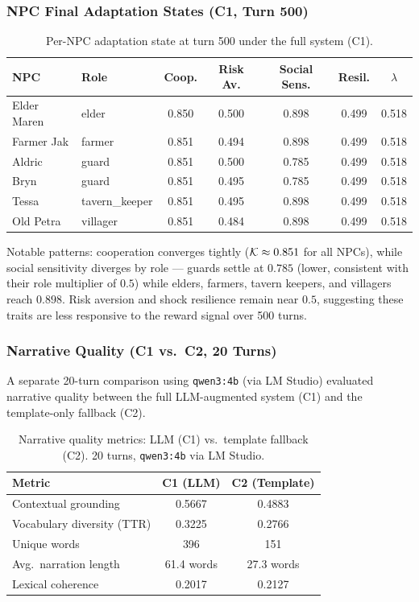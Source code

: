 \subsubsection{NPC Final Adaptation States (C1, Turn 500)}

\begin{table}[ht]
\centering
\caption{Per-NPC adaptation state at turn 500 under the full system (C1).}
\label{tab:npc_final_states}
\begin{tabular}{@{}llccccc@{}}
\toprule
NPC & Role & Coop. & Risk Av. & Social Sens. & Resil. & $\lambda$ \\
\midrule
Elder Maren & elder         & 0.850 & 0.500 & 0.898 & 0.499 & 0.518 \\
Farmer Jak  & farmer        & 0.851 & 0.494 & 0.898 & 0.499 & 0.518 \\
Aldric      & guard         & 0.851 & 0.500 & 0.785 & 0.499 & 0.518 \\
Bryn        & guard         & 0.851 & 0.495 & 0.785 & 0.499 & 0.518 \\
Tessa       & tavern\_keeper & 0.851 & 0.495 & 0.898 & 0.499 & 0.518 \\
Old Petra   & villager      & 0.851 & 0.484 & 0.898 & 0.499 & 0.518 \\
\bottomrule
\end{tabular}
\end{table}

Notable patterns: cooperation converges tightly ($\mathcal{K} \approx 0.851$ for all NPCs), while social sensitivity diverges by role --- guards settle at $0.785$ (lower, consistent with their role multiplier of $0.5$) while elders, farmers, tavern keepers, and villagers reach $0.898$. Risk aversion and shock resilience remain near $0.5$, suggesting these traits are less responsive to the reward signal over 500 turns.

\subsubsection{Narrative Quality (C1 vs.\ C2, 20 Turns)}

A separate 20-turn comparison using \texttt{qwen3:4b} (via LM Studio) evaluated narrative quality between the full LLM-augmented system (C1) and the template-only fallback (C2).

\begin{table}[ht]
\centering
\caption{Narrative quality metrics: LLM (C1) vs.\ template fallback (C2). 20 turns, \texttt{qwen3:4b} via LM Studio.}
\label{tab:narrative_quality}
\begin{tabular}{@{}lcc@{}}
\toprule
Metric & C1 (LLM) & C2 (Template) \\
\midrule
Contextual grounding    & 0.5667 & 0.4883 \\
Vocabulary diversity (TTR) & 0.3225 & 0.2766 \\
Unique words            & 396    & 151    \\
Avg.\ narration length  & 61.4 words & 27.3 words \\
Lexical coherence       & 0.2017 & 0.2127 \\
\bottomrule
\end{tabular}
\end{table}

